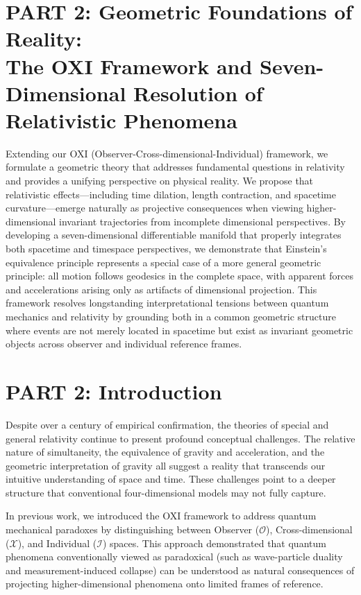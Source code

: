 \documentclass{article}
\begin{document}
\section{PART 2: Geometric Foundations of Reality: \\
The OXI Framework and Seven-Dimensional Resolution of Relativistic Phenomena}
Extending our OXI (Observer-Cross-dimensional-Individual) framework, we formulate a geometric theory that addresses fundamental questions in relativity and provides a unifying perspective on physical reality. We propose that relativistic effects—including time dilation, length contraction, and spacetime curvature—emerge naturally as projective consequences when viewing higher-dimensional invariant trajectories from incomplete dimensional perspectives. By developing a seven-dimensional differentiable manifold that properly integrates both spacetime and timespace perspectives, we demonstrate that Einstein's equivalence principle represents a special case of a more general geometric principle: all motion follows geodesics in the complete space, with apparent forces and accelerations arising only as artifacts of dimensional projection. This framework resolves longstanding interpretational tensions between quantum mechanics and relativity by grounding both in a common geometric structure where events are not merely located in spacetime but exist as invariant geometric objects across observer and individual reference frames.

\section{PART 2: Introduction}

Despite over a century of empirical confirmation, the theories of special and general relativity continue to present profound conceptual challenges. The relative nature of simultaneity, the equivalence of gravity and acceleration, and the geometric interpretation of gravity all suggest a reality that transcends our intuitive understanding of space and time. These challenges point to a deeper structure that conventional four-dimensional models may not fully capture.

In previous work, we introduced the OXI framework to address quantum mechanical paradoxes by distinguishing between Observer ($\mathcal{O}$), Cross-dimensional ($\mathcal{X}$), and Individual ($\mathcal{I}$) spaces. This approach demonstrated that quantum phenomena conventionally viewed as paradoxical (such as wave-particle duality and measurement-induced collapse) can be understood as natural consequences of projecting higher-dimensional phenomena onto limited frames of reference.
\end{document}
